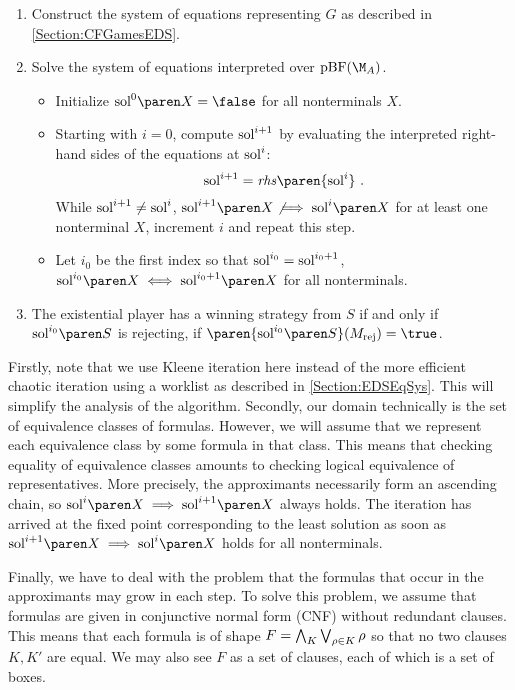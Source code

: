 \documentclass[../../diss.tex]{subfiles}
\begin{document}
\begin{enumerate}
    \item
        Construct the system of equations representing $G$ as described in \cref{Section:CFGamesEDS}.
    \item
        Solve the system of equations interpreted over $\pBF(\nfatransmonoid{A})$.
        \begin{itemize}
            \item
                Initialize $\sol{0}{X} = \false$ for all nonterminals $X$.
            \item
                Starting with $i = 0$, compute $\text{sol}^{i+1}$ by evaluating the interpreted right-hand sides of the equations at $\text{sol}^{i}$:
                \[
                    \soli{i+1} = \rhs \paren{ \soli{i}}
                    \ .
                \]
                While $\text{sol}^{i+1} \neq \text{sol}^{i}$, \ie $\sol{i+1}{X} \not\implies \sol{i}{X}$ for at least one nonterminal $X$, increment $i$ and repeat this step.
            \item
                Let $i_0$ be the first index so that $\text{sol}^{i_0} = \text{sol}^{i_0 + 1}$, \ie $\sol{i_0}{X} \lequiv \sol{i_0 + 1}{X}$ for all nonterminals.
        \end{itemize}
    \item
        The existential player has a winning strategy from $S$ if and only if $\sol{i_0}{S}$ is rejecting, \ie if $\paren{\sol{i_0}{S}}(\Mrej) = \true$.
\end{enumerate}

Firstly, note that we use Kleene iteration here instead of the more efficient chaotic iteration using a worklist as described in \cref{Section:EDSEqSys}.
This will simplify the analysis of the algorithm.
Secondly, our domain technically is the set of equivalence classes of formulas.
However, we will assume that we represent each equivalence class by some formula in that class.
This means that checking equality of equivalence classes amounts to checking logical equivalence of representatives.
More precisely, the approximants necessarily form an ascending chain, so $\sol{i}{X} \implies \sol{i+1}{X}$ always holds.
The iteration has arrived at the fixed point corresponding to the least solution as soon as $\sol{i+1}{X} \implies \sol{i}{X}$ holds for all nonterminals.

Finally, we have to deal with the problem that the formulas that occur in the approximants may grow in each step.
To solve this problem, we assume that formulas are given in conjunctive normal form (CNF) without redundant clauses.
This means that each formula is of shape $F = \bigwedge_{K} \bigvee_{\tbox \in K} \tbox$ so that no two clauses $K, K'$ are equal.
We may also see $F$ as a set of clauses, each of which is a set of boxes.
\end{document}
